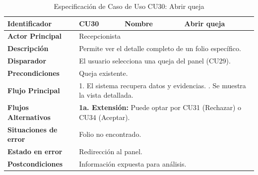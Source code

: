 \begingroup
\setlength{\parskip}{0pt}
\begin{longtable}{|p{3.5cm}|p{2cm}|p{2.5cm}|p{7cm}|}
\caption{Especificación de Caso de Uso CU30: Abrir queja}
\label{tab:cu30} \\
\hline
\textbf{Identificador} & CU30 & \textbf{Nombre} & Abrir queja \\ \hline
\textbf{Actor Principal} & \multicolumn{3}{p{11.5cm}|}{Recepcionista} \\ \hline
\textbf{Descripción} & \multicolumn{3}{p{11.5cm}|}{Permite ver el detalle completo de un folio específico.} \\ \hline
\textbf{Disparador} & \multicolumn{3}{p{11.5cm}|}{El usuario selecciona una queja del panel (CU29).} \\ \hline
\textbf{Precondiciones} & \multicolumn{3}{p{11.5cm}|}{Queja existente.} \\ \hline
\textbf{Flujo Principal} & \multicolumn{3}{p{11.5cm}|}{1. El sistema recupera datos y evidencias. \newline 2. Se muestra la vista detallada.} \\ \hline
\textbf{Flujos Alternativos} & \multicolumn{3}{p{11.5cm}|}{\textbf{1a. Extensión:} Puede optar por CU31 (Rechazar) o CU34 (Aceptar).} \\ \hline
\textbf{Situaciones de error} & \multicolumn{3}{p{11.5cm}|}{Folio no encontrado.} \\ \hline
\textbf{Estado en error} & \multicolumn{3}{p{11.5cm}|}{Redirección al panel.} \\ \hline
\textbf{Postcondiciones} & \multicolumn{3}{p{11.5cm}|}{Información expuesta para análisis.} \\ \hline
\end{longtable}
\endgroup

\vspace{0.8cm}

